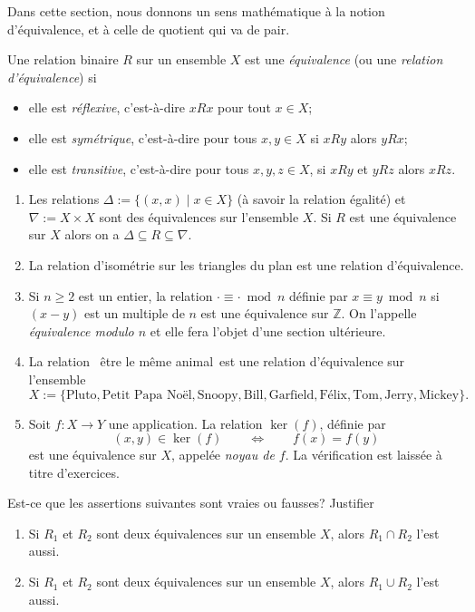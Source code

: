 \documentclass[french,course,oneside,theoremnosection]{lecture}
\newcommand{\Z}{\mathbb{Z}}
\begin{document}
Dans cette section, nous donnons un sens mathématique à la notion d'équivalence, et à celle de quotient qui va de pair.

\begin{definition}
Une relation binaire $R$ sur un ensemble $X$ est une \emph{équivalence} (ou une \emph{relation d'équivalence}) si
\begin{itemize}
\item elle est \emph{réflexive}, c'est-à-dire $xRx$ pour tout $x\in X$;
\item elle est \emph{symétrique}, c'est-à-dire pour tous $x,y\in X$ si $xRy$ alors $yRx$;
\item elle est \emph{transitive}, c'est-à-dire pour tous $x, y, z\in X$, si $xRy$ et $yRz$ alors $xRz$.
\end{itemize}

\end{definition}
\begin{example}\label{ex:pluto}
\begin{enumerate}
\item Les relations $\Delta{:=}\{(x,x) \mid x \in X\}$ (à savoir la relation égalité) et $\nabla{:=}X \times X$ sont des équivalences sur l'ensemble $X$. Si $R$ est une équivalence sur $X$ alors on a $\Delta  \subseteq R \subseteq \nabla$.
\item La relation d'isométrie sur les triangles du plan est une relation d'équivalence.
\item Si $n\geq 2$ est un entier,  la relation $\cdot \equiv \cdot \bmod n$ définie par $x \equiv y \bmod n$ si $(x-y)$ est un multiple de $n$ est une équivalence sur $\Z$. On l'appelle \emph{équivalence modulo $n$} et elle fera l'objet d'une section ultérieure.
\item\label{it:pluto} La relation \og~être le même animal~\fg{}est une relation d'équivalence sur l'ensemble 
\[X:=\{\text{Pluto}, \text{Petit Papa Noël}, \text{Snoopy}, \text{Bill}, \text{Garfield}, \text{Félix}, \text{Tom}, \text{Jerry}, \text{Mickey}\}.\]

\item Soit $f\colon X \to Y$ une application. La relation $\ker(f)$, définie par 
\[
(x,y)\in \ker(f) \qquad \iff \qquad f(x)=f(y)
\]
est une équivalence sur $X$, appelée \emph{noyau de $f$}. La vérification est laissée à titre d'exercices.
\end{enumerate}
\end{example}

\begin{exercise}
Est-ce que les assertions suivantes sont vraies ou fausses? Justifier
\begin{enumerate}
\item Si $R_1$ et $R_2$ sont deux équivalences sur un ensemble $X$, alors $R_1 \cap R_2$ l'est aussi.
\item Si $R_1$ et $R_2$ sont deux équivalences sur un ensemble $X$, alors $R_1 \cup R_2$ l'est aussi.
\end{enumerate}

\end{exercise}
\end{document}
